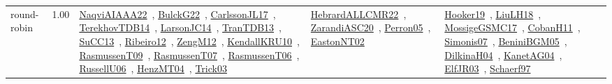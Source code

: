 {\begin{longtable}{p{3cm}r>{\raggedright\arraybackslash}p{6cm}>{\raggedright\arraybackslash}p{6cm}>{\raggedright\arraybackslash}p{8cm}}
\index{round-robin}\index{ApplicationAreas!round-robin}round-robin &  1.00 & \href{../works/NaqviAIAAA22.pdf}{NaqviAIAAA22}~\cite{NaqviAIAAA22}, \href{../works/BulckG22.pdf}{BulckG22}~\cite{BulckG22}, \href{../works/CarlssonJL17.pdf}{CarlssonJL17}~\cite{CarlssonJL17}, \href{../works/TerekhovTDB14.pdf}{TerekhovTDB14}~\cite{TerekhovTDB14}, \href{../works/LarsonJC14.pdf}{LarsonJC14}~\cite{LarsonJC14}, \href{../works/TranTDB13.pdf}{TranTDB13}~\cite{TranTDB13}, \href{../works/SuCC13.pdf}{SuCC13}~\cite{SuCC13}, \href{../works/Ribeiro12.pdf}{Ribeiro12}~\cite{Ribeiro12}, \href{../works/ZengM12.pdf}{ZengM12}~\cite{ZengM12}, \href{../works/KendallKRU10.pdf}{KendallKRU10}~\cite{KendallKRU10}, \href{../works/RasmussenT09.pdf}{RasmussenT09}~\cite{RasmussenT09}, \href{../works/RasmussenT07.pdf}{RasmussenT07}~\cite{RasmussenT07}, \href{../works/RasmussenT06.pdf}{RasmussenT06}~\cite{RasmussenT06}, \href{../works/RussellU06.pdf}{RussellU06}~\cite{RussellU06}, \href{../works/HenzMT04.pdf}{HenzMT04}~\cite{HenzMT04}, \href{../works/Trick03.pdf}{Trick03}~\cite{Trick03} & \href{../works/HebrardALLCMR22.pdf}{HebrardALLCMR22}~\cite{HebrardALLCMR22}, \href{../works/ZarandiASC20.pdf}{ZarandiASC20}~\cite{ZarandiASC20}, \href{../works/Perron05.pdf}{Perron05}~\cite{Perron05}, \href{../works/EastonNT02.pdf}{EastonNT02}~\cite{EastonNT02} & \href{../works/Hooker19.pdf}{Hooker19}~\cite{Hooker19}, \href{../works/LiuLH18.pdf}{LiuLH18}~\cite{LiuLH18}, \href{../works/MossigeGSMC17.pdf}{MossigeGSMC17}~\cite{MossigeGSMC17}, \href{../works/CobanH11.pdf}{CobanH11}~\cite{CobanH11}, \href{../works/Simonis07.pdf}{Simonis07}~\cite{Simonis07}, \href{../works/BeniniBGM05.pdf}{BeniniBGM05}~\cite{BeniniBGM05}, \href{../works/DilkinaH04.pdf}{DilkinaH04}~\cite{DilkinaH04}, \href{../works/KanetAG04.pdf}{KanetAG04}~\cite{KanetAG04}, \href{../works/ElfJR03.pdf}{ElfJR03}~\cite{ElfJR03}, \href{../works/Schaerf97.pdf}{Schaerf97}~\cite{Schaerf97}\\

\end{longtable}}
